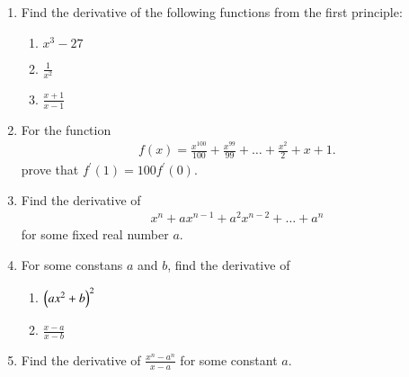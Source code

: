 \begin{enumerate}[label=\arabic*.,ref=\thesubsection.\theenumi]
\item Find the derivative of the following functions from the first principle:
%
\begin{enumerate}
\item  $x^3-27$
\item  $\frac{1}{x^2}$
\item  $\frac{x+1}{x-1}$
\end{enumerate}
%
\item For the function 
\begin{align}
f(x) = \frac{x^100}{100} + \frac{x^99}{99} + \dots + \frac{x^2}{2} + x + 1.
\end{align}
%
prove that $f^{'}(1) = 100f^{'}(0) $.
%
\item Find the derivative of 
\begin{align}
x^n+ax^{n-1}+a^2x^{n-2}+\dots+a^n
\end{align}
%
for some fixed real number $a$.
%
\item For some constans $a$ and $b$, find the derivative of
%
\begin{enumerate}
\item  $\left(ax^2+b\right)^2$
\item  $\frac{x-a}{x-b}$
\end{enumerate}
%
\item Find the derivative of $\frac{x^n-a^n}{x-a}$ for some constant $a$.
%


\end{enumerate}
